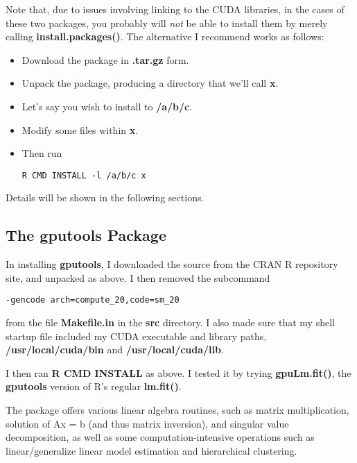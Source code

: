 Note that, due to issues involving linking to the CUDA libraries, in
the cases of these two packages, you probably will {\it not} be able to
install them by merely calling {\bf install.packages()}.   The
alternative I recommend works as follows:

\begin{itemize}

\item Download the package in {\bf .tar.gz} form.

\item Unpack the package, producing a directory that we'll call {\bf x}.

\item Let's say you wish to install to {\bf /a/b/c}.

\item Modify some files within {\bf x}.

\item Then run

\begin{lstlisting}
R CMD INSTALL -l /a/b/c x
\end{lstlisting}

\end{itemize}

Details will be shown in the following sections.

\subsection{The gputools Package}

In installing {\bf gputools}, I downloaded the source from the CRAN R
repository site, and unpacked as above.  I then removed the subcommand

\begin{verbatim}
-gencode arch=compute_20,code=sm_20
\end{verbatim}

from the file {\bf Makefile.in} in the {\bf src} directory.  I also
made sure that my shell startup file included my CUDA executable and
library paths, {\bf /usr/local/cuda/bin} and {\bf /usr/local/cuda/lib}.

I then ran {\bf R CMD INSTALL} as above.  I tested it by trying 
{\bf gpuLm.fit()}, the {\bf gputools} version of R's regular {\bf
lm.fit()}.

The package offers various linear algebra routines, such as matrix
multiplication, solution of Ax = b (and thus matrix inversion), and
singular value decomposition, as well as some computation-intensive
operations such as linear/generalize linear model estimation and
hierarchical clustering.

